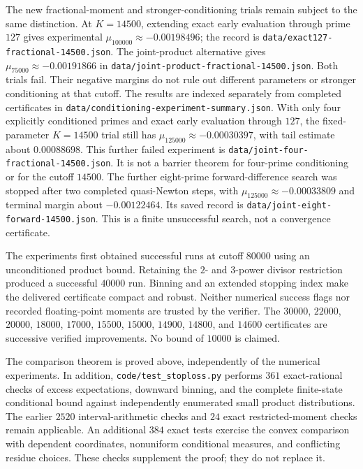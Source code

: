 \documentclass[11pt]{article}
\begin{document}
The new fractional-moment and stronger-conditioning trials remain subject
to the same distinction. At $K=14500$, extending exact early evaluation
through prime $127$ gives experimental $\mu_{100000}\approx-0.00198496$;
the record is \texttt{data/exact127-fractional-14500.json}.
The joint-product alternative gives
$\mu_{75000}\approx-0.00191866$ in
\texttt{data/joint-product-fractional-14500.json}. Both trials fail.
Their negative margins do not rule out different parameters or stronger
conditioning at that cutoff. The results are indexed separately from
completed certificates in \texttt{data/conditioning-experiment-summary.json}.
With only four explicitly conditioned primes and exact early evaluation
through $127$, the fixed-parameter $K=14500$ trial still has
$\mu_{125000}\approx-0.00030397$, with tail estimate about $0.00088698$.
This further failed experiment is
\texttt{data/joint-four-fractional-14500.json}. It is not a barrier theorem
for four-prime conditioning or for the cutoff $14500$.
The further eight-prime forward-difference search was stopped after two
completed quasi-Newton steps, with
$\mu_{125000}\approx-0.00033809$ and terminal margin about $-0.00122464$.
Its saved record is \texttt{data/joint-eight-forward-14500.json}.
This is a finite unsuccessful search, not a convergence certificate.

The experiments first obtained successful runs at cutoff $80000$ using an
unconditioned product bound. Retaining the $2$- and $3$-power divisor
restriction produced a successful $40000$ run. Binning and an extended
stopping index make the delivered certificate compact and robust.
Neither numerical success flags nor recorded floating-point moments are
trusted by the verifier. The $30000$, $22000$, $20000$, $18000$, $17000$,
$15500$, $15000$, $14900$, $14800$, and $14600$ certificates are
successive verified improvements. No bound of $10000$ is claimed.

The comparison theorem is proved above, independently of the numerical
experiments. In addition, \texttt{code/test\_stoploss.py} performs $361$
exact-rational checks of excess expectations, downward binning, and the
complete finite-state conditional bound against independently enumerated
small product distributions. The earlier $2520$ interval-arithmetic checks
and $24$ exact restricted-moment checks remain applicable. An additional
$384$ exact tests exercise the convex comparison with dependent coordinates,
nonuniform conditional measures, and conflicting residue choices. These checks
supplement the proof; they do not replace it.
\end{document}
